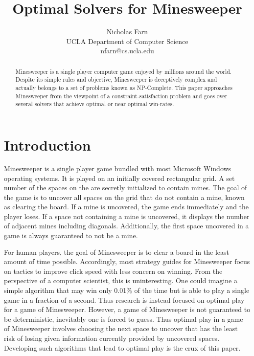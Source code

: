 \documentclass[letterpaper]{article}
\title{Optimal Solvers for Minesweeper}
\author{Nicholas Farn\\ UCLA Department of Computer Science\\ nfarn@cs.ucla.edu}
\begin{document}
\maketitle

\begin{abstract}
Minesweeper is a single player computer game enjoyed by millions around the world.  Despite its simple rules and objective, Minesweeper is deceptively complex and actually belongs to a set of problems known as NP-Complete.  This paper approaches Minesweeper from the viewpoint of a constraint-satisfaction problem and goes over several solvers that achieve optimal or near optimal win-rates.
\end{abstract}

\section{Introduction}
Minesweeper is a single player game bundled with most Microsoft Windows operating systems.  It is played on an initially covered rectangular grid.  A set number of the spaces on the are secretly initialized to contain mines.  The goal of the game is to uncover all spaces on the grid that do not contain a mine, known as clearing the board.  If a mine is uncovered, the game ends immediately and the player loses.  If a space not containing a mine is uncovered, it displays the number of adjacent mines including diagonals.  Additionally, the first space uncovered in a game is always guaranteed to not be a mine.

For human players, the goal of Minesweeper is to clear a board in the least amount of time possible.  Accordingly, most strategy guides for Minesweeper focus on tactics to improve click speed with less concern on winning.  From the perspective of a computer scientist, this is uninteresting.  One could imagine a simple algorithm that may win only 0.01\% of the time but is able to play a single game in a fraction of a second.  Thus research is instead focused on optimal play for a game of Minesweeper.  However, a game of Minesweeper is not guaranteed to be deterministic, inevitably one is forced to guess.  Thus optimal play in a game of Minesweeper involves choosing the next space to uncover that has the least risk of losing given information currently provided by uncovered spaces.  Developing such algorithms that lead to optimal play is the crux of this paper.
\end{document}

